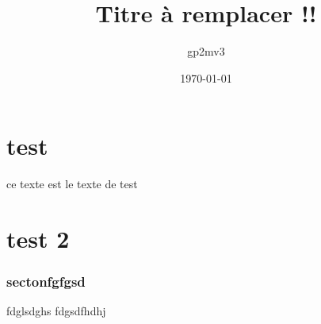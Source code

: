 \documentclass[11pt,a4paper,french]{article}
\title{Titre à remplacer !!}
\author{gp2mv3}
\date{\today}
\begin{document}
\maketitle

\part{test}
ce texte est le texte de test
\part{test 2}
\section{sectonfgfgsd}
fdglsdghs fdgsdfhdhj
\end{document}
